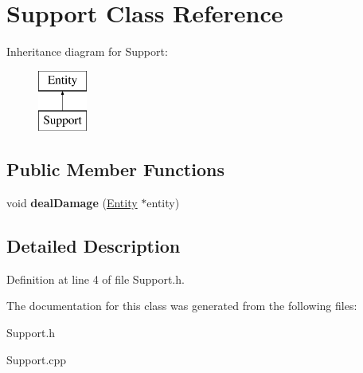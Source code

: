 \hypertarget{classSupport}{}\section{Support Class Reference}
\label{classSupport}
Inheritance diagram for Support\+:\begin{figure}[H]
\begin{center}
\leavevmode
\includegraphics[height=2.000000cm]{classSupport}
\end{center}
\end{figure}
\subsection*{Public Member Functions}
\begin{DoxyCompactItemize}
\item 
\mbox{\label{classSupport_a5f2cb243e746adea36b3c78548029ce3}} 
void {\bfseries deal\+Damage} (\hyperlink{classEntity}{Entity} $\ast$entity)
\end{DoxyCompactItemize}


\subsection{Detailed Description}


Definition at line 4 of file Support.\+h.



The documentation for this class was generated from the following files\+:\begin{DoxyCompactItemize}
\item 
Support.\+h\item 
Support.\+cpp\end{DoxyCompactItemize}
